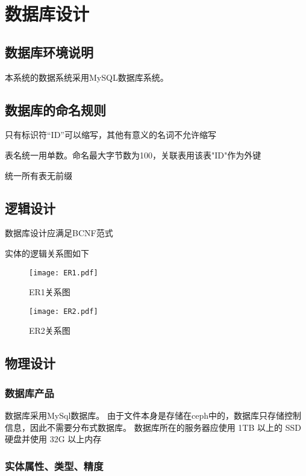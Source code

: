 \chapter{数据库设计}
\section{数据库环境说明}
本系统的数据系统采用MySQL数据库系统。

\section{数据库的命名规则}
只有标识符“ID”可以缩写，其他有意义的名词不允许缩写

表名统一用单数。命名最大字节数为100，关联表用该表"ID"作为外键

统一所有表无前缀

\section{逻辑设计}
数据库设计应满足BCNF范式

实体的逻辑关系图如下
\begin{figure}
    \centering
    \texttt{[image: ER1.pdf]}
    \caption{ER1关系图}\label{fig:noted-figure}
\end{figure}

\begin{figure}
    \centering
    \texttt{[image: ER2.pdf]}
    \caption{ER2关系图}\label{fig:noted-figure}
\end{figure}

\section{物理设计}
\subsection{数据库产品}
数据库采用MySql数据库。
由于文件本身是存储在ceph中的，数据库只存储控制信息，因此不需要分布式数据库。
数据库所在的服务器应使用 1TB 以上的 SSD 硬盘并使用 32G 以上内存

\subsection{实体属性、类型、精度}
